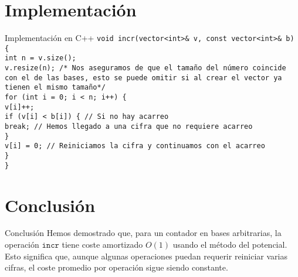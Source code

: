 \documentclass[aspectratio=169]{beamer}
\begin{document}
\section{Implementación}
\begin{frame}{Implementación en C++}
    \texttt{void incr(vector<int>\& v, const vector<int>\& b) \{\\
    int n = v.size();\\
    v.resize(n); /* Nos aseguramos de que el tamaño del número coincide con el de las bases, esto se puede omitir si al crear el vector ya tienen el mismo tamaño*/\\
    for (int i = 0; i < n; i++) \{\\
    \qquad    v[i]++;\\
    \qquad    if (v[i] < b[i]) \{ // Si no hay acarreo\\
    \qquad \qquad        break; // Hemos llegado a una cifra que no requiere acarreo\\
    \qquad    \}\\
    \qquad    v[i] = 0; // Reiniciamos la cifra y continuamos con el acarreo\\
    \qquad \}\\
\}}
\end{frame}

\section{Conclusión}
\begin{frame}{Conclusión}
    Hemos demostrado que, para un contador en bases arbitrarias, la operación $\texttt{incr}$ tiene coste amortizado $O(1)$ usando el método del potencial. Esto significa que, aunque algunas operaciones puedan requerir reiniciar varias cifras, el coste promedio por operación sigue siendo constante.
\end{frame}
\end{document}
